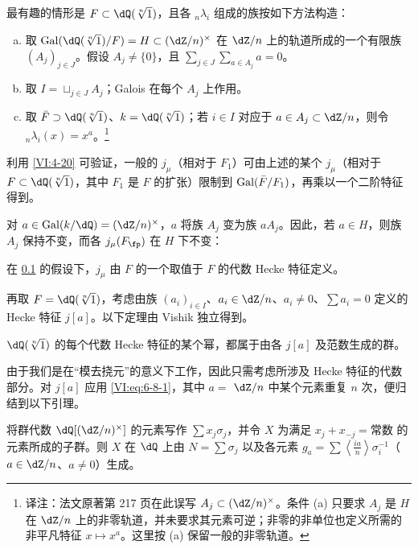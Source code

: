 \subsection{}\label{VI:6-9}

最有趣的情形是 $F\subset \dQ(\sqrt[n]{1})$，且各 $_n \lambda_i$ 组成的族按如下方法构造：
\begin{enumerate}[a)]
  \item 取 $\gal(\dQ(\sqrt[n]{1})/F)=H\subset (\dZ/n)^\times$ 在 $\dZ/n$ 上的轨道所成的一个有限族 $(A_j)_{j\in J}$。假设 $A_j\ne\{0\}$，且 $\sum_{j\in J} \sum_{a\in A_j} a=0$。
  \item 取 $I=\sqcup_{j\in J} A_j$；Galois 在每个 $A_j$ 上作用。
  \item 取 $\bar F\supset \dQ(\sqrt[n]{1})$、$k=\dQ(\sqrt[n]{1})$；若 $i\in I$ 对应于 $a\in A_j\subset \dZ/n$，则令 $_n\lambda_i(x)=x^a$。\footnote{译注：法文原著第 217 页在此误写 $A_j\subset(\dZ/n)^\times$。条件 (a) 只要求 $A_j$ 是 $H$ 在 $\dZ/n$ 上的非零轨道，并未要求其元素可逆；非零的非单位也定义所需的非平凡特征 $x\mapsto x^a$。这里按 (a) 保留一般的非零轨道。}
\end{enumerate}

利用 \ref{VI:4-20} 可验证，一般的 $j_\mu$（相对于 $F_1$）可由上述的某个 $j_\mu$（相对于 $F\subset \dQ(\sqrt[n]{1})$，其中 $F_1$ 是 $F$ 的扩张）限制到 $\operatorname{Gal}(\bar F/F_1)$，再乘以一个二阶特征得到。

对 $a\in \gal(k/\dQ)=(\dZ/n)^\times$，$a$ 将族 $A_j$ 变为族 $a A_j$。因此，若 $a\in H$，则族 $A_j$ 保持不变，而各 $j_\mu(F_\fp)$ 在 $H$ 下不变：

\begin{proposition_}\label{VI:6-10}
在 \ref{VI:6-9} 的假设下，$j_\mu$ 由 $F$ 的一个取值于 $F$ 的代数 Hecke 特征定义。
\end{proposition_}

再取 $F=\dQ(\sqrt[n]{1})$，考虑由族 $(a_i)_{i\in I}$、$a_i\in \dZ/n$、$a_i\ne 0$、$\sum a_i=0$ 定义的 Hecke 特征 $j[a]$。以下定理由 Vishik 独立得到。

\begin{theorem_}\label{VI:6-11}
$\dQ(\sqrt[n]{1})$ 的每个代数 Hecke 特征的某个幂，都属于由各 $j[a]$ 及范数生成的群。
\end{theorem_}

由于我们是在“模去挠元”的意义下工作，因此只需考虑所涉及 Hecke 特征的代数部分。对 $j[a]$ 应用 \eqref{VI:eq:6-8-1}，其中 $a=$ $\dZ/n$ 中某个元素重复 $n$ 次，便归结到以下引理。

\begin{lemma_}\label{VI:6-12}
将群代数 $\dQ[(\dZ/n)^\times]$ 的元素写作 $\sum x_j \sigma_j$，并令 $X$ 为满足 $x_j+x_{-j}=\text{常数}$ 的元素所成的子群。则 $X$ 在 $\dQ$ 上由 $N=\sum \sigma_j$ 以及各元素 $g_a=\sum \left\langle \frac{i a}{n}\right\rangle \sigma_i^{-1}$（$a\in \dZ/n$、$a\ne 0$）生成。
\end{lemma_}

